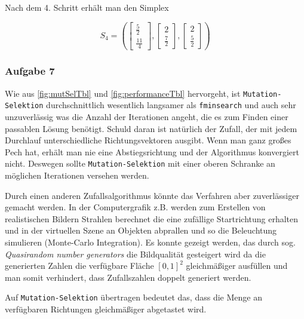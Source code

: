 \documentclass[a4paper, 12pt]{report}
\begin{document}
Nach dem 4. Schritt erhält man den Simplex

$$S_4 = (\begin{bmatrix}\frac{5}{2}\\\frac{11}{4}\end{bmatrix}, \begin{bmatrix}2\\\frac{7}{2}\end{bmatrix}, \begin{bmatrix}2\\\frac{5}{2}\end{bmatrix})$$

\subsubsection{Aufgabe 7}
Wie aus \autoref{fig:mutSelTbl} und \autoref{fig:performanceTbl} hervorgeht, ist \lstinline[basicstyle=\ttfamily\color{black}]|Mutation-Selektion|
durchschnittlich wesentlich langsamer als \lstinline[basicstyle=\ttfamily\color{black}]|fminsearch| und auch sehr unzuverlässig was die Anzahl der
Iterationen angeht, die es zum Finden einer passablen Lösung benötigt. Schuld daran ist natürlich der Zufall, der mit jedem Durchlauf unterschiedliche
Richtungsvektoren ausgibt. Wenn man ganz großes Pech hat, erhält man nie eine Abstiegsrichtung und der Algorithmus konvergiert nicht. Deswegen sollte
\lstinline[basicstyle=\ttfamily\color{black}]|Mutation-Selektion| mit einer oberen Schranke an möglichen Iterationen versehen werden.\par
Durch einen anderen Zufallsalgorithmus könnte das Verfahren aber zuverlässiger gemacht werden. In der Computergrafik z.B. werden zum Erstellen von
realistischen Bildern Strahlen berechnet die eine zufällige Startrichtung erhalten und in der virtuellen Szene an Objekten abprallen und so
die Beleuchtung simulieren (Monte-Carlo Integration). Es konnte gezeigt werden, das durch sog. \textit{Quasirandom number generators}
die Bildqualität gesteigert wird da die generierten Zahlen die verfügbare Fläche $[0, 1]^2$ gleichmäßiger ausfüllen und man somit verhindert, dass
Zufallszahlen doppelt generiert werden.\par
Auf \lstinline[basicstyle=\ttfamily\color{black}]|Mutation-Selektion| übertragen bedeutet das, dass die Menge an verfügbaren Richtungen gleichmäßiger
abgetastet wird.
\end{document}

